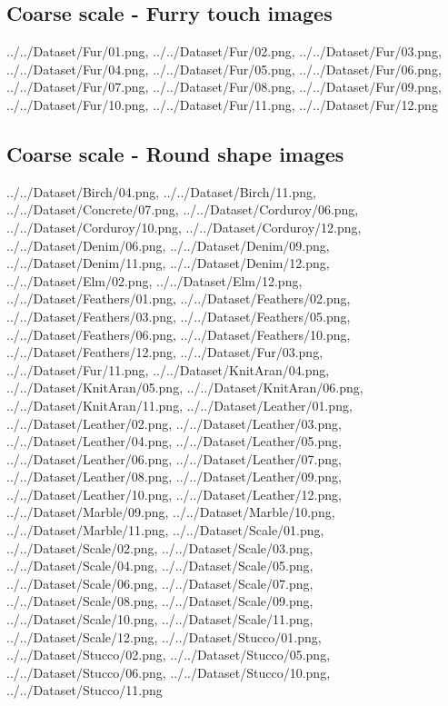 \newpage
\subsection{Coarse scale - Furry touch images}
{../../Dataset/Fur/01.png,
../../Dataset/Fur/02.png,
../../Dataset/Fur/03.png,
../../Dataset/Fur/04.png,
../../Dataset/Fur/05.png,
../../Dataset/Fur/06.png,
../../Dataset/Fur/07.png,
../../Dataset/Fur/08.png,
../../Dataset/Fur/09.png,
../../Dataset/Fur/10.png,
../../Dataset/Fur/11.png,
../../Dataset/Fur/12.png}

\newpage
\subsection{Coarse scale - Round shape images}
{../../Dataset/Birch/04.png,
../../Dataset/Birch/11.png,
../../Dataset/Concrete/07.png,
../../Dataset/Corduroy/06.png,
../../Dataset/Corduroy/10.png,
../../Dataset/Corduroy/12.png,
../../Dataset/Denim/06.png,
../../Dataset/Denim/09.png,
../../Dataset/Denim/11.png,
../../Dataset/Denim/12.png,
../../Dataset/Elm/02.png,
../../Dataset/Elm/12.png,
../../Dataset/Feathers/01.png,
../../Dataset/Feathers/02.png,
../../Dataset/Feathers/03.png,
../../Dataset/Feathers/05.png,
../../Dataset/Feathers/06.png,
../../Dataset/Feathers/10.png,
../../Dataset/Feathers/12.png,
../../Dataset/Fur/03.png,
../../Dataset/Fur/11.png,
../../Dataset/KnitAran/04.png,
../../Dataset/KnitAran/05.png,
../../Dataset/KnitAran/06.png,
../../Dataset/KnitAran/11.png,
../../Dataset/Leather/01.png,
../../Dataset/Leather/02.png,
../../Dataset/Leather/03.png,
../../Dataset/Leather/04.png,
../../Dataset/Leather/05.png,
../../Dataset/Leather/06.png,
../../Dataset/Leather/07.png,
../../Dataset/Leather/08.png,
../../Dataset/Leather/09.png,
../../Dataset/Leather/10.png,
../../Dataset/Leather/12.png,
../../Dataset/Marble/09.png,
../../Dataset/Marble/10.png,
../../Dataset/Marble/11.png,
../../Dataset/Scale/01.png,
../../Dataset/Scale/02.png,
../../Dataset/Scale/03.png,
../../Dataset/Scale/04.png,
../../Dataset/Scale/05.png,
../../Dataset/Scale/06.png,
../../Dataset/Scale/07.png,
../../Dataset/Scale/08.png,
../../Dataset/Scale/09.png,
../../Dataset/Scale/10.png,
../../Dataset/Scale/11.png,
../../Dataset/Scale/12.png,
../../Dataset/Stucco/01.png,
../../Dataset/Stucco/02.png,
../../Dataset/Stucco/05.png,
../../Dataset/Stucco/06.png,
../../Dataset/Stucco/10.png,
../../Dataset/Stucco/11.png}

